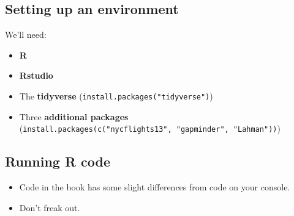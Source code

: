 \documentclass[
  letterpaper,
  DIV=11,
  numbers=noendperiod]{scrartcl}
\providecommand{\tightlist}{%
  \setlength{\itemsep}{0pt}\setlength{\parskip}{0pt}}\usepackage{longtable,booktabs,array}
\begin{document}
\hypertarget{setting-up-an-environment}{%
\subsection{Setting up an environment}\label{setting-up-an-environment}}

We'll need:

\begin{itemize}
\tightlist
\item
  \textbf{R}
\item
  \textbf{Rstudio}
\item
  The \textbf{tidyverse} (\texttt{install.packages("tidyverse")})
\item
  Three \textbf{additional packages}
  (\texttt{install.packages(c("nycflights13",\ "gapminder",\ "Lahman"))})
\end{itemize}

\hypertarget{running-r-code}{%
\subsection{Running R code}\label{running-r-code}}

\begin{itemize}
\tightlist
\item
  Code in the book has some slight differences from code on your
  console.
\item
  Don't freak out.
\end{itemize}
\end{document}
